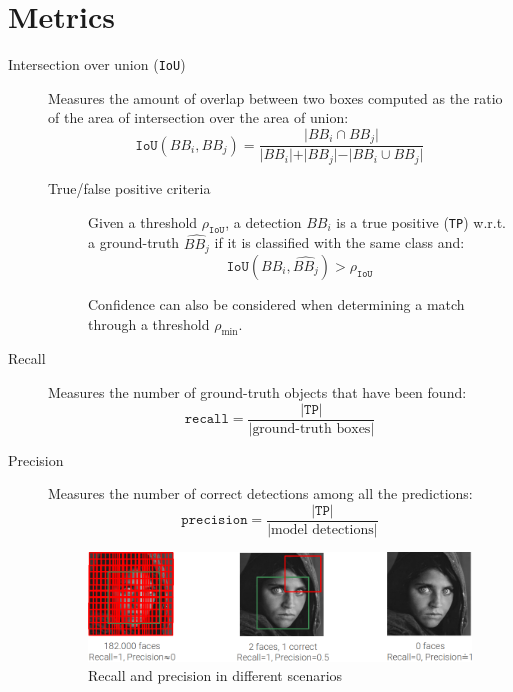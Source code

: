 \section{Metrics}

\begin{description}
    \item[Intersection over union (\texttt{IoU})] 
        Measures the amount of overlap between two boxes computed as the ratio of the area of intersection over the area of union:
        \[ \texttt{IoU}(BB_i, BB_j) = \frac{\vert BB_i \cap BB_j \vert}{\vert BB_i \vert + \vert BB_j \vert - \vert BB_i \cup BB_j \vert} \]

        \begin{description}
            \item[True/false positive criteria] 
                Given a threshold $\rho_\texttt{IoU}$, a detection $BB_i$ is a true positive (\texttt{TP}) w.r.t. a ground-truth $\widehat{BB_j}$ if it is classified with the same class and:
                \[ \texttt{IoU}(BB_i, \widehat{BB_j}) > \rho_\texttt{IoU} \]

                \begin{remark}
                    Confidence can also be considered when determining a match through a threshold $\rho_\text{min}$.
                \end{remark}
        \end{description}

    \item[Recall]
        Measures the number of ground-truth objects that have been found:
        \[ \texttt{recall} = \frac{\vert \texttt{TP} \vert}{\vert \text{ground-truth boxes} \vert} \]

    \item[Precision]
        Measures the number of correct detections among all the predictions:
        \[ \texttt{precision} = \frac{\vert \texttt{TP} \vert}{\vert \text{model detections} \vert} \]

    \begin{figure}[H]
        \centering
        \includegraphics[width=0.7\linewidth]{./img/obj_det_recall_precision.png}
        \caption{
            Recall and precision in different scenarios
        }
    \end{figure}


\end{description}
